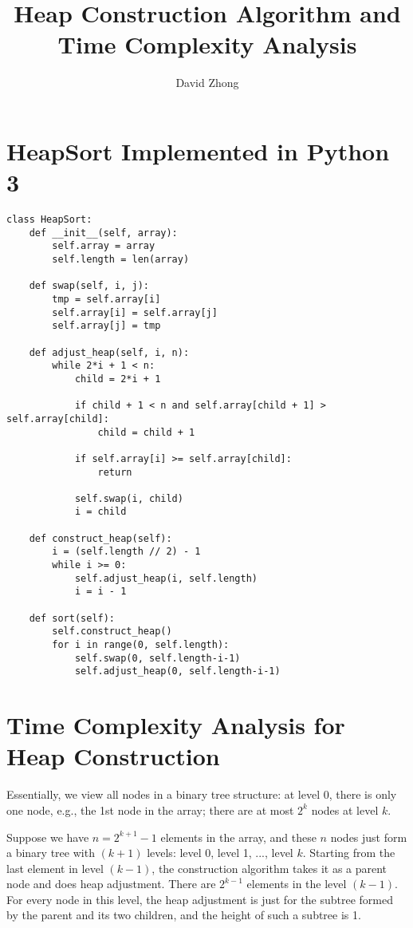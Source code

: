 \documentclass[11pt, oneside]{article}   	%
\title{Heap Construction Algorithm and Time Complexity Analysis}
\author{David Zhong}
\begin{document}
\maketitle

\section{HeapSort Implemented in Python 3}
\begin{verbatim}
class HeapSort:
    def __init__(self, array):
        self.array = array
        self.length = len(array)

    def swap(self, i, j):
        tmp = self.array[i]
        self.array[i] = self.array[j]
        self.array[j] = tmp

    def adjust_heap(self, i, n):
        while 2*i + 1 < n:
            child = 2*i + 1
            
            if child + 1 < n and self.array[child + 1] > self.array[child]:
                child = child + 1

            if self.array[i] >= self.array[child]:
                return
            
            self.swap(i, child)
            i = child
        
    def construct_heap(self):
        i = (self.length // 2) - 1
        while i >= 0:
            self.adjust_heap(i, self.length)
            i = i - 1

    def sort(self):
        self.construct_heap()
        for i in range(0, self.length):
            self.swap(0, self.length-i-1)
            self.adjust_heap(0, self.length-i-1)

\end{verbatim}

\newpage
\section{Time Complexity Analysis for Heap Construction}
Essentially, we view all nodes in a binary tree structure: at level 0, there is only one node, e.g., the 1st node in the array;  there are at most $2^k$ nodes at level $k$.

Suppose we have $n = 2^{k+1}-1$ elements in the array, and these $n$ nodes just form a binary tree with $(k+1)$ levels: level 0, level 1, ..., level $k$. Starting from the last element in level $(k-1)$, the construction algorithm takes it as a parent node and does heap adjustment. There are $2^{k-1}$ elements in the level $(k-1)$. For every node in this level, the heap adjustment is just for the subtree formed by the parent and its two children, and the height of such a subtree is 1.
\end{document}
